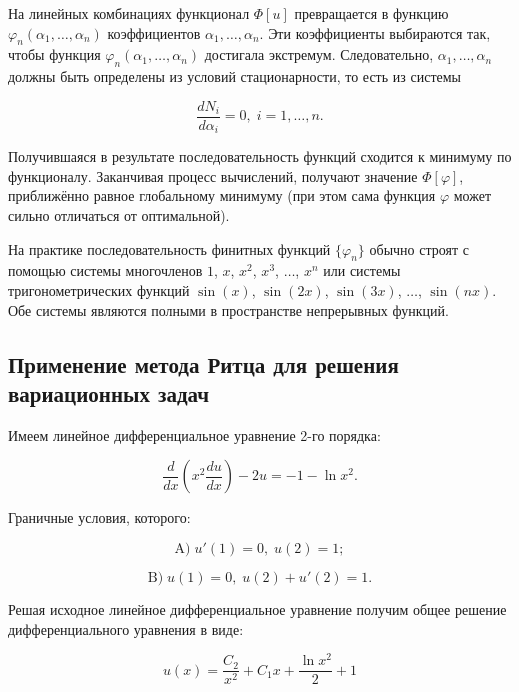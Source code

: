 \documentclass{article}
\begin{document}
На линейных комбинациях функционал $\Phi[u]$ превращается в функцию $\varphi_{n}(\alpha_{1}, \ldots, \alpha_{n})$ коэффициентов $\alpha_{1}, \ldots, \alpha_{n}$. Эти коэффициенты выбираются так, чтобы функция $\varphi_{n}(\alpha_{1}, \ldots, \alpha_{n})$ достигала экстремум. Следовательно, $\alpha_{1}, \ldots, \alpha_{n}$ должны быть определены из условий стационарности, то есть из системы

\begin{displaymath}
	\frac{d N_{i}}{d\alpha_{i}} = 0, \; i = 1, \ldots, n.
\end{displaymath}

Получившаяся в результате последовательность функций сходится к минимуму по функционалу. Заканчивая процесс вычислений, получают значение $\Phi[\varphi]$, приближённо равное глобальному минимуму (при этом сама функция $\varphi$ может сильно отличаться от оптимальной).

На практике последовательность финитных функций ${\lbrace \varphi_{n} \rbrace}$ обычно строят с помощью системы многочленов $1$, $x$, $x^2$, $x^3$, $\ldots$, $x^n$ или системы тригонометрических функций $\sin (x)$, $\sin (2x)$, $\sin (3x)$, $\ldots$, $\sin (nx)$. Обе системы являются полными в пространстве непрерывных функций.

\subsection{Применение метода Ритца для решения вариационных задач}

Имеем линейное дифференциальное уравнение 2-го порядка:

\begin{displaymath}
	\frac{d}{dx} \left( x^2 \frac{d u}{dx} \right) - 2u = -1 - \ln{x^2}.
\end{displaymath}

\noindent Граничные условия, которого:

\begin{displaymath}
	\text{A)} \; u'(1) = 0, \; u(2) = 1;
\end{displaymath}

\begin{displaymath}
	\text{B)} \; u(1) = 0, \; u(2) + u'(2) = 1.
\end{displaymath}

\noindent Решая исходное линейное дифференциальное уравнение получим общее решение дифференциального уравнения в виде:

\begin{displaymath}
	u(x) = \frac{C_{2}}{x^2} + C_{1}x + \frac{\ln{x^2}}{2} + 1
\end{displaymath}
\end{document}
